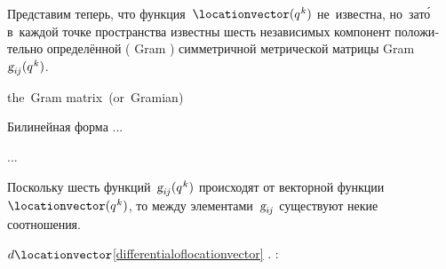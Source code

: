\begin{otherlanguage}{russian}

Представим теперь, что функция~${\locationvector(q^{\hspace{.1ex}k})}$ не~известна, но~\hbox{зат\'{о}} в~каждой точке пространства известны шесть независимых компонент положительно определённой ( Gram ) симметричной метрической матрицы Gram~${\textsl{g}_{i\hspace{-0.1ex}j}(q^{\hspace{.1ex}k})}$.

the Gram matrix (or Gramian)

Билинейная форма ...

\nopagebreak
...

Поскольку шесть функций~${\textsl{g}_{i\hspace{-0.1ex}j}(q^{\hspace{.1ex}k})}$ происходят от векторной функции~${\locationvector(q^{\hspace{.1ex}k})}$, то между элементами~$\textsl{g}_{i\hspace{-0.1ex}j}$ существуют некие соотношения.

 ${d\locationvector}$\;\eqref{differentialoflocationvector}\ru{\:---} .
   :


\end{otherlanguage}
